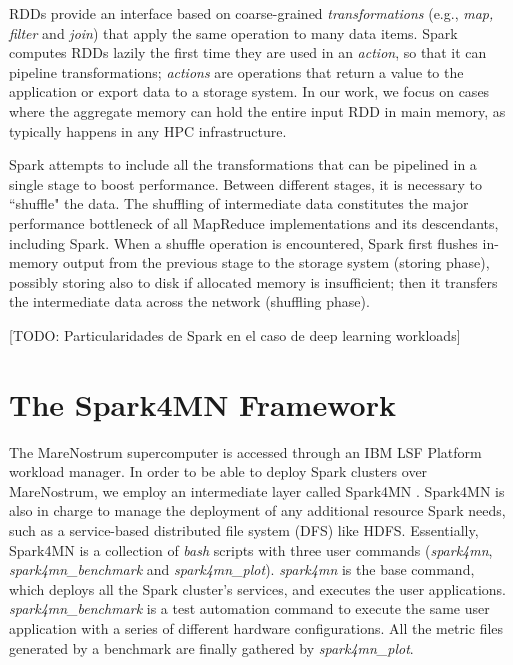 \documentclass[journal]{IEEEtran}
\begin{document}
RDDs provide an interface based on coarse-grained {\it transformations} (e.g., \emph{map, filter} and \emph{join}) that apply the same operation to many data items. Spark computes RDDs lazily the first time they are used in an {\it action}, so that it can pipeline transformations; {\it actions} are operations that return a value to the application or export data to a storage system.
In our work, we focus on cases where the aggregate memory can hold the entire input RDD in main memory, as typically happens in any HPC infrastructure.

Spark attempts to include all the transformations that can be pipelined in a single stage to boost performance. Between different stages, it is necessary to ``shuffle" the data. The shuffling of intermediate data constitutes the major performance bottleneck of all MapReduce implementations and its descendants, including Spark. When a shuffle operation is encountered, Spark first flushes in-memory output from the previous stage to the storage system (storing phase), possibly storing also to disk if allocated memory is insufficient; then it transfers the intermediate data across the network (shuffling phase). 

[TODO: Particularidades de Spark en el caso de deep learning workloads]

\section{The Spark4MN Framework}
\label{sec:spark4mn}
The MareNostrum supercomputer is accessed through an IBM LSF Platform workload manager. In order to be able to deploy Spark clusters over MareNostrum, we employ an intermediate layer called Spark4MN \cite{conf/bigdataconf/TousGournaris15}. Spark4MN is also in charge to manage the deployment of any additional resource Spark needs, such as a service-based distributed file system (DFS) like HDFS.
Essentially, Spark4MN is a collection of {\it bash} scripts with three user commands ({\it spark4mn}, {\it spark4mn\_benchmark} and {\it spark4mn\_plot}). {\it spark4mn} is the base command, which deploys all the Spark
cluster's services, and executes the user applications. {\it spark4mn\_benchmark} is a test automation command to execute the same user application with a series of different hardware configurations. All the metric files generated by a benchmark are finally gathered by {\it spark4mn\_plot}.
\end{document}
